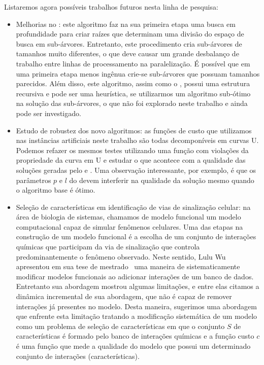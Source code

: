 Listaremos agora possíveis trabalhos futuros nesta linha de pesquisa:
\begin{itemize}
    \item{Melhorias no :}  este algoritmo faz na sua primeira etapa uma busca em profundidade para criar raízes que 
determinam uma divisão do espaço de busca em sub-árvores. 
        Entretanto, este procedimento cria sub-árvores de tamanhos 
        muito diferentes, o que deve causar um grande desbalanço de
        trabalho entre linhas de processamento na paralelização. É 
        possível que em uma primeira etapa menos ingênua crie-se 
        sub-árvores que possuam tamanhos parecidos. Além disso, este 
        algoritmo, assim como o , possui uma estrutura
        recursiva e pode ser uma heurística, se utilizarmos um algoritmo
        sub-ótimo na solução das sub-árvores, o que não foi explorado
        neste trabalho e ainda pode ser investigado.
    \item{Estudo de robustez dos novo algoritmos:} as funções de custo
        que utilizamos nas instâncias artificiais neste trabalho são
        todas decomponíveis em curvas U. Podemos refazer os mesmos 
        testes utilizando uma função com violações da propriedade da
        curva em U e estudar o que acontece com a qualidade das soluções
        geradas pelo  e . Uma observação 
        interessante, por exemplo, é que os parâmetros $p$ e $l$ do
         devem interferir na qualidade da solução mesmo
        quando o algoritmo base é ótimo.
    \item{Seleção de características em identificação de vias de 
        sinalização celular:} na área de biologia de sistemas, chamamos
        de modelo funcional um modelo computacional capaz de simular
        fenômenos celulares. Uma das etapas na construção de um modelo
        funcional é a escolha de um conjunto de interações químicas que
        participam da via de sinalização que controla predominantemente 
        o fenômeno observado. Neste sentido, Lulu Wu apresentou 
        em sua tese de mestrado~\cite{Wu15} uma maneira de 
        sistematicamente modificar modelos funcionais ao adicionar 
        interações de um banco de dados. Entretanto sua abordagem 
        mostrou algumas limitações, e entre elas citamos a dinâmica
        incremental de sua abordagem, que não é capaz de remover
        interações já presentes no modelo. Desta maneira, sugerimos uma
        abordagem que enfrente esta limitação tratando a modificação
        sistemática de um modelo como um problema de seleção de
        características em que o conjunto $S$ de características é
        formado pelo banco de interações químicas e a função custo $c$ 
        é uma função que mede a qualidade do modelo que possui
        um determinado conjunto de interações (características).
\end{itemize}
